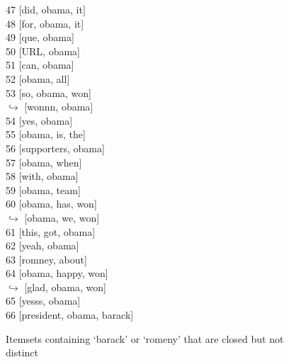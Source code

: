 \documentclass[letterpaper,12pt,titlepage,oneside,final]{book}
\begin{document}
\begin{figure}[h]
\begin{minipage}[t]{0.3\textwidth}
     
     47 [did, obama, it] \\
     48 [for, obama, it] \\ 
     49 [que, obama] \\
     50 [URL, obama] \\
     51 [can, obama] \\
     52 [obama, all] \\
     53 [so, obama, won] \\
     $\hookrightarrow$ [wonnn, obama] \\
     54 [yes, obama] \\
     55 [obama, is, the] \\
     56 [supporters, obama] \\
     57 [obama, when] \\
     58 [with, obama] \\
     59 [obama, team] \\
     60 [obama, has, won] \\
     $\hookrightarrow$ [obama, we, won]\\
     61 [this, got, obama] \\
     62 [yeah, obama] \\
     63 [romney, about] \\
     64 [obama, happy, won] \\
    $\hookrightarrow$ [glad, obama, won] \\
     65 [yesss, obama] \\
     66 [president, obama, barack] 
\end{minipage}
\caption{Itemsets containing `barack' or `romeny' that are closed but not distinct}
\label{fig:closedNDistinct}
\end{figure}







\end{document}
